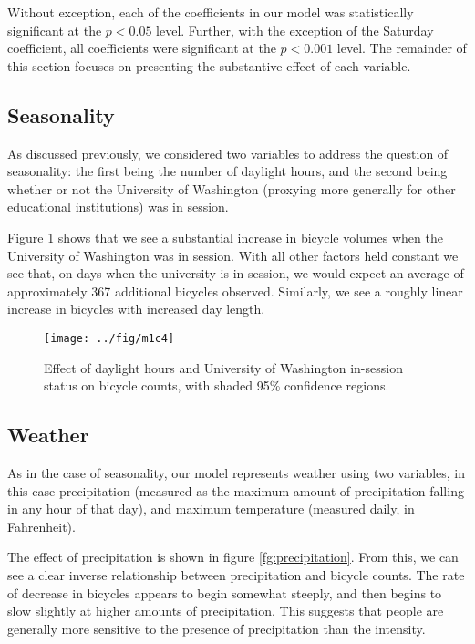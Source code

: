 \documentclass[12pt,letterpaper,article,twocolumn]{memoir}
\begin{document}
Without exception, each of the coefficients in our model was
statistically significant at the $p < 0.05$ level. Further, with the
exception of the Saturday coefficient, all coefficients were
significant at the $p < 0.001$ level. The remainder of this section
focuses on presenting the substantive effect of each variable.

\FloatBarrier
\subsection*{Seasonality}
As discussed previously, we considered two variables to address the
question of seasonality: the first being the number of daylight hours,
and the second being whether or not the University of Washington
(proxying more generally for other educational institutions) was in
session.

Figure \ref{fg:seasonality} shows that we see a substantial increase
in bicycle volumes when the University of Washington was in session.
With all other factors held constant we see that, on days when the
university is in session, we would expect an average of approximately
367 additional bicycles observed. Similarly, we see a roughly linear
increase in bicycles with increased day length.

\begin{figure}[htbp!]
  \centering
  \texttt{[image: ../fig/m1c4]}
  \caption{Effect of daylight hours and University of Washington
    in-session status on bicycle counts, with shaded 95\% confidence
    regions.}
  \label{fg:seasonality}
\end{figure}

\FloatBarrier
\subsection*{Weather}
As in the case of seasonality, our model represents weather using two
variables, in this case precipitation (measured as the maximum amount
of precipitation falling in any hour of that day), and maximum
temperature (measured daily, in Fahrenheit).

The effect of precipitation is shown in figure \ref{fg:precipitation}.
From this, we can see a clear inverse relationship between
precipitation and bicycle counts. The rate of decrease in bicycles
appears to begin somewhat steeply, and then begins to slow slightly at
higher amounts of precipitation. This suggests that people are
generally more sensitive to the presence of precipitation than the
intensity.
\end{document}
